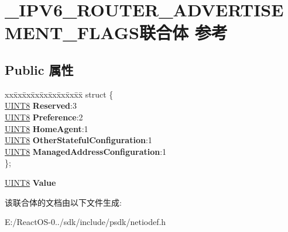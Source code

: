 \hypertarget{union___i_p_v6___r_o_u_t_e_r___a_d_v_e_r_t_i_s_e_m_e_n_t___f_l_a_g_s}{}\section{\+\_\+\+I\+P\+V6\+\_\+\+R\+O\+U\+T\+E\+R\+\_\+\+A\+D\+V\+E\+R\+T\+I\+S\+E\+M\+E\+N\+T\+\_\+\+F\+L\+A\+G\+S联合体 参考}
\label{union___i_p_v6___r_o_u_t_e_r___a_d_v_e_r_t_i_s_e_m_e_n_t___f_l_a_g_s}
\subsection*{Public 属性}
\begin{DoxyCompactItemize}
\item 
\mbox{\label{union___i_p_v6___r_o_u_t_e_r___a_d_v_e_r_t_i_s_e_m_e_n_t___f_l_a_g_s_a3253c7725c44a29b8c56cfade913662d}} 
\begin{tabbing}
xx\=xx\=xx\=xx\=xx\=xx\=xx\=xx\=xx\=\kill
struct \{\\
\>\hyperlink{_processor_bind_8h_ab27e9918b538ce9d8ca692479b375b6a}{UINT8} {\bfseries Reserved}:3\\
\>\hyperlink{_processor_bind_8h_ab27e9918b538ce9d8ca692479b375b6a}{UINT8} {\bfseries Preference}:2\\
\>\hyperlink{_processor_bind_8h_ab27e9918b538ce9d8ca692479b375b6a}{UINT8} {\bfseries HomeAgent}:1\\
\>\hyperlink{_processor_bind_8h_ab27e9918b538ce9d8ca692479b375b6a}{UINT8} {\bfseries OtherStatefulConfiguration}:1\\
\>\hyperlink{_processor_bind_8h_ab27e9918b538ce9d8ca692479b375b6a}{UINT8} {\bfseries ManagedAddressConfiguration}:1\\
\}; \\

\end{tabbing}\item 
\mbox{\label{union___i_p_v6___r_o_u_t_e_r___a_d_v_e_r_t_i_s_e_m_e_n_t___f_l_a_g_s_ae2b6015cd04aeab66ca1e2cd8ba65ba7}} 
\hyperlink{_processor_bind_8h_ab27e9918b538ce9d8ca692479b375b6a}{U\+I\+N\+T8} {\bfseries Value}
\end{DoxyCompactItemize}


该联合体的文档由以下文件生成\+:\begin{DoxyCompactItemize}
\item 
E\+:/\+React\+O\+S-\/0../sdk/include/psdk/netiodef.\+h\end{DoxyCompactItemize}
